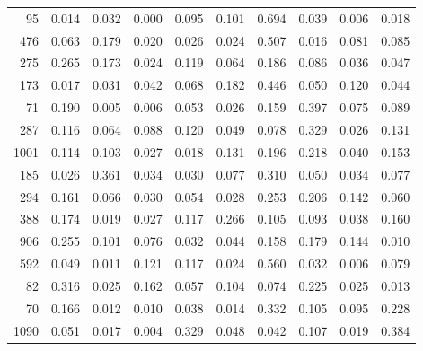 \begin{longtable}{rrrrrrrrrr}
    95 & 0.014 & 0.032 & 0.000 & 0.095 & 0.101 & 0.694 & 0.039 & 0.006 & 0.018 \\
   476 & 0.063 & 0.179 & 0.020 & 0.026 & 0.024 & 0.507 & 0.016 & 0.081 & 0.085 \\
   275 & 0.265 & 0.173 & 0.024 & 0.119 & 0.064 & 0.186 & 0.086 & 0.036 & 0.047 \\
   173 & 0.017 & 0.031 & 0.042 & 0.068 & 0.182 & 0.446 & 0.050 & 0.120 & 0.044 \\
    71 & 0.190 & 0.005 & 0.006 & 0.053 & 0.026 & 0.159 & 0.397 & 0.075 & 0.089 \\
   287 & 0.116 & 0.064 & 0.088 & 0.120 & 0.049 & 0.078 & 0.329 & 0.026 & 0.131 \\
  1001 & 0.114 & 0.103 & 0.027 & 0.018 & 0.131 & 0.196 & 0.218 & 0.040 & 0.153 \\
   185 & 0.026 & 0.361 & 0.034 & 0.030 & 0.077 & 0.310 & 0.050 & 0.034 & 0.077 \\
   294 & 0.161 & 0.066 & 0.030 & 0.054 & 0.028 & 0.253 & 0.206 & 0.142 & 0.060 \\
   388 & 0.174 & 0.019 & 0.027 & 0.117 & 0.266 & 0.105 & 0.093 & 0.038 & 0.160 \\
   906 & 0.255 & 0.101 & 0.076 & 0.032 & 0.044 & 0.158 & 0.179 & 0.144 & 0.010 \\
   592 & 0.049 & 0.011 & 0.121 & 0.117 & 0.024 & 0.560 & 0.032 & 0.006 & 0.079 \\
    82 & 0.316 & 0.025 & 0.162 & 0.057 & 0.104 & 0.074 & 0.225 & 0.025 & 0.013 \\
    70 & 0.166 & 0.012 & 0.010 & 0.038 & 0.014 & 0.332 & 0.105 & 0.095 & 0.228 \\
  1090 & 0.051 & 0.017 & 0.004 & 0.329 & 0.048 & 0.042 & 0.107 & 0.019 & 0.384 \\
\end{longtable}
